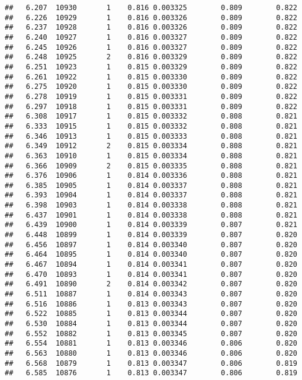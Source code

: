 \documentclass[
]{book}
\begin{document}
\begin{verbatim}
##   6.207  10930       1    0.816 0.003325        0.809        0.822
##   6.226  10929       1    0.816 0.003326        0.809        0.822
##   6.237  10928       1    0.816 0.003326        0.809        0.822
##   6.240  10927       1    0.816 0.003327        0.809        0.822
##   6.245  10926       1    0.816 0.003327        0.809        0.822
##   6.248  10925       2    0.816 0.003329        0.809        0.822
##   6.251  10923       1    0.815 0.003329        0.809        0.822
##   6.261  10922       1    0.815 0.003330        0.809        0.822
##   6.275  10920       1    0.815 0.003330        0.809        0.822
##   6.278  10919       1    0.815 0.003331        0.809        0.822
##   6.297  10918       1    0.815 0.003331        0.809        0.822
##   6.308  10917       1    0.815 0.003332        0.808        0.821
##   6.333  10915       1    0.815 0.003332        0.808        0.821
##   6.346  10913       1    0.815 0.003333        0.808        0.821
##   6.349  10912       2    0.815 0.003334        0.808        0.821
##   6.363  10910       1    0.815 0.003334        0.808        0.821
##   6.366  10909       2    0.815 0.003335        0.808        0.821
##   6.376  10906       1    0.814 0.003336        0.808        0.821
##   6.385  10905       1    0.814 0.003337        0.808        0.821
##   6.393  10904       1    0.814 0.003337        0.808        0.821
##   6.398  10903       1    0.814 0.003338        0.808        0.821
##   6.437  10901       1    0.814 0.003338        0.808        0.821
##   6.439  10900       1    0.814 0.003339        0.807        0.821
##   6.448  10899       1    0.814 0.003339        0.807        0.820
##   6.456  10897       1    0.814 0.003340        0.807        0.820
##   6.464  10895       1    0.814 0.003340        0.807        0.820
##   6.467  10894       1    0.814 0.003341        0.807        0.820
##   6.470  10893       1    0.814 0.003341        0.807        0.820
##   6.491  10890       2    0.814 0.003342        0.807        0.820
##   6.511  10887       1    0.814 0.003343        0.807        0.820
##   6.516  10886       1    0.813 0.003343        0.807        0.820
##   6.522  10885       1    0.813 0.003344        0.807        0.820
##   6.530  10884       1    0.813 0.003344        0.807        0.820
##   6.552  10882       1    0.813 0.003345        0.807        0.820
##   6.554  10881       1    0.813 0.003346        0.806        0.820
##   6.563  10880       1    0.813 0.003346        0.806        0.820
##   6.568  10879       1    0.813 0.003347        0.806        0.819
##   6.585  10876       1    0.813 0.003347        0.806        0.819

\end{verbatim}
\end{document}
